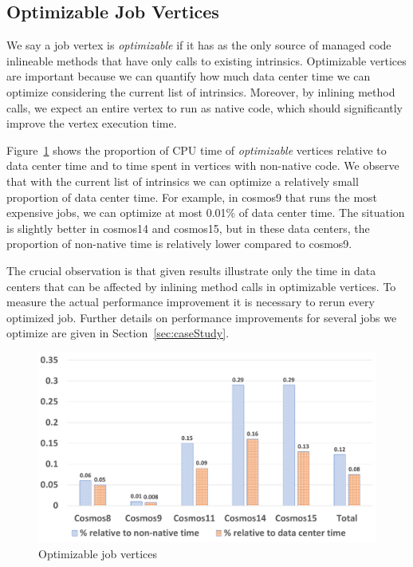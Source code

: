 
\subsection{Optimizable Job Vertices}


We say a job vertex is \emph{optimizable} if it has as the only source of managed code inlineable methods that have only calls to existing intrinsics. 
Optimizable vertices are important because we can quantify how much data center time we can optimize considering the current list of intrinsics. 
Moreover, by inlining method calls, we expect an entire vertex to run as native code, which should significantly improve the vertex execution time.

Figure~\ref{fig:optimizable} shows the proportion of CPU time of \emph{optimizable} vertices relative to data center time and to time spent in vertices with non-native code. 
We observe that with the current list of intrinsics we can optimize a relatively small proportion of data center time. 
For example, in cosmos9 that runs the most expensive jobs, we can optimize at most 0.01\% of data center time. 
The situation is slightly better in cosmos14 and cosmos15, but in these data centers, the proportion of non-native time is relatively lower compared to cosmos9.

The crucial observation is that given results illustrate only the time in data centers that can be affected by inlining method calls in optimizable vertices. 
To measure the actual performance improvement it is necessary to rerun every optimized job. 
Further details on performance improvements for several jobs we optimize are given in Section~\ref{sec:caseStudy}.

\begin{figure}[ht]
\includegraphics[scale=0.8]{graphs/optimizable}
\caption{Optimizable job vertices}
\label{fig:optimizable}
\end{figure}

